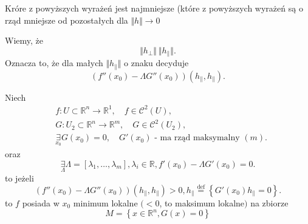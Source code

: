\documentclass[../main.tex]{subfiles}
\begin{document}
\begin{pytanie}
    Króre z powyższych wyrażeń jest najmniejsze (które z powyższych wyrażeń są o rząd mniejsze od pozostałych dla $\Vert h \Vert \to 0$
\end{pytanie}

Wiemy, że
\[
\Vert h_\perp \Vert ~ \Vert h_\parallel \Vert
.\]
Oznacza to, że dla małych $\Vert h_\parallel \Vert$ o znaku decyduje \[
    (f''(x_0) - \Lambda G''(x_0))(h_\parallel,h_\parallel)
.\]

\begin{tw}
    Niech
    \begin{align*}
        &f:U\subset \mathbb{R}^n \to \mathbb{R}^1,\quad f\in \mathcal{C}^2(U), \\
        &G: U_2\subset\mathbb{R}^n\to\mathbb{R}^m,\quad G\in \mathcal{C}^2(U_2),\\
        &\underset{x_0}{\exists} G(x_0) = 0, \quad G'(x_0) \text{ - ma rząd maksymalny }(m)
    .\end{align*}
    oraz \[
        \underset{\Lambda}{\exists} \Lambda = \left[ \lambda_1,\ldots,\lambda_m \right], \lambda_i \in \mathbb{R}, f'(x_0) - \Lambda G'(x_0) = 0
    .\] to jeżeli
    \[
        (f''(x_0)-\Lambda G''(x_0))(h_\parallel,h_\parallel) > 0,
        h_\parallel \overset{\text{def}}{=} \left \{G'(x_0) h_\parallel = 0 \right \}
    .\] to $f$ posiada w $x_0$ minimum lokalne $(<0$, to maksimum lokalne$)$ na zbiorze
\[
    M = \left\{ x\in \mathbb{R}^n, G(x) = 0 \right\}
\]
\end{tw}
\end{document}
